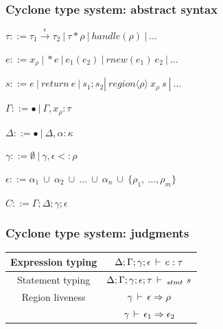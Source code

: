 \begin{frame}[fragile]
    \frametitle{Cyclone type system: abstract syntax}

    $\tau ::= \tau_1 \xrightarrow{\epsilon} \tau_2\ |
            \ \tau * \rho\ |\ handle(\rho)\ |\ ... $
    \\ \vspace{10pt}

    $e ::= x_\rho\ |\ *e\ |\ e_1(e_2)\ |\ rnew(e_1)\ e_2\ |\ ...$
    \\ \vspace{10pt}

    $s ::=  e\ |\ return\ e\ |\ s_1; s_2 |
            \ region \langle \rho \rangle\ x_\rho\ s\ |\ ...$
    \\ \vspace{10pt}

    $\Gamma ::= \bullet\ |\ \Gamma, x_\rho: \tau$
    \\ \vspace{10pt}

    $\Delta ::= \bullet\ |\ \Delta, \alpha: \kappa$
    \\ \vspace{10pt}

    $\gamma ::= \emptyset\ |\ \gamma, \epsilon <: \rho$
    \\ \vspace{10pt}

    $\epsilon ::= \alpha_1\ \cup\ \alpha_2\ \cup \ ...\ \cup\ \alpha_n \ \cup \
                  \{ \rho_1,\ ..., \rho_m \}$
    \\ \vspace{10pt}

    $C ::= \Gamma; \Delta; \gamma; \epsilon$
\end{frame}

\begin{frame}
    \frametitle{Cyclone type system: judgments}
    \begin{center}
    \begin{tabular}{c | c}
    Expression typing & $\Delta; \Gamma; \gamma; \epsilon \,\vdash\, e: \tau$         \\
                      \hline
    Statement typing  & $\Delta; \Gamma; \gamma; \epsilon; \tau \,\vdash\,_{stmt}\ s$ \\
                      \hline
    Region liveness   & $\gamma \,\vdash\, \epsilon \Rightarrow \rho$                 \\
                      & $\gamma \,\vdash\, \epsilon_1 \Rightarrow \epsilon_2$
    \end{tabular}
    \end{center}
\end{frame}

